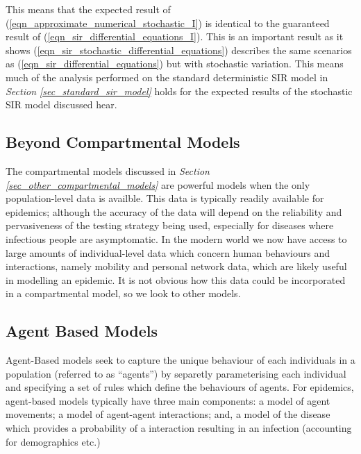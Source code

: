 \documentclass[11pt,a4paper]{article}
\theoremstyle{break}
\begin{document}
  \par This means that the expected result of (\ref{eqn_approximate_numerical_stochastic_I}) is identical to the guaranteed result of (\ref{eqn_sir_differential_equations_I}). This is an important result as it shows (\ref{eqn_sir_stochastic_differential_equations}) describes the same scenarios as (\ref{eqn_sir_differential_equations}) but with stochastic variation. This means much of the analysis performed on the standard deterministic SIR model in \textit{Section \ref{sec_standard_sir_model}} holds for the expected results of the stochastic SIR model discussed hear.

\subsection{Beyond Compartmental Models}

  \par The compartmental models discussed in \textit{Section \ref{sec_other_compartmental_models}} are powerful models when the only population-level data is availble. This data is typically readily available for epidemics; although the accuracy of the data will depend on the reliability and pervasiveness of the testing strategy being used, especially for diseases where infectious people are asymptomatic. In the modern world we now have access to large amounts of individual-level data which concern human behaviours and interactions, namely mobility and personal network data, which are likely useful in modelling an epidemic. It is not obvious how this data could be incorporated in a compartmental model, so we look to other models.

\subsection*{Agent Based Models}
  \par Agent-Based models seek to capture the unique behaviour of each individuals in a population (referred to as ``agents'') by separetly parameterising each individual and specifying a set of rules which define the behaviours of agents. For epidemics, agent-based models  typically have three main components: a model of agent movements; a model of agent-agent interactions; and, a model of the disease which provides a probability of a interaction resulting in an infection (accounting for demographics etc.)
\end{document}
